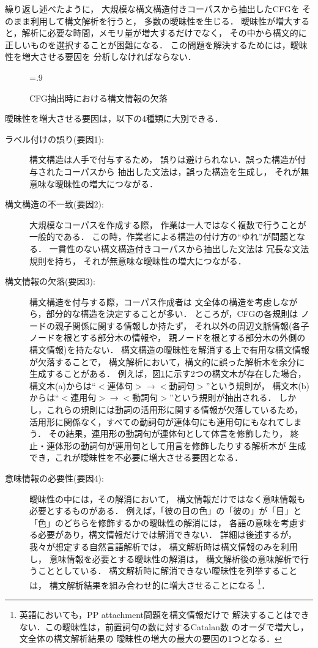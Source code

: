 繰り返し述べたように，
大規模な構文構造付きコーパスから抽出したCFGを
そのまま利用して構文解析を行うと，
多数の曖昧性を生じる．
曖昧性が増大すると，解析に必要な時間，メモリ量が増大するだけでなく，
その中から構文的に正しいものを選択することが困難になる．
この問題を解決するためには，曖昧性を増大させる要因を
分析しなければならない．

\begin{figure}[tp]
  \centering
  \epsfxsize=.9\textwidth
  \caption{CFG抽出時における構文情報の欠落}
  \label{fig:lack_of_syn}
\end{figure}

曖昧性を増大させる要因は，以下の4種類に大別できる．
\begin{description}
\item[ラベル付けの誤り(要因1): ] 構文構造は人手で付与するため，
  誤りは避けられない．誤った構造が付与されたコーパスから
  抽出した文法は，誤った構造を生成し，
  それが無意味な曖昧性の増大につながる．
\item[構文構造の不一致(要因2): ] 大規模なコーパスを作成する際，
  作業は一人ではなく複数で行うことが一般的である．
  この時，作業者による構造の付け方の``ゆれ''が問題となる．
  一貫性のない構文構造付きコーパスから抽出した文法は
  冗長な文法規則を持ち，
  それが無意味な曖昧性の増大につながる．
\item[構文情報の欠落(要因3): ] 構文構造を付与する際，コーパス作成者は
  文全体の構造を考慮しながら，部分的な構造を決定することが多い．
  ところが，CFGの各規則は
  ノードの親子関係に関する情報しか持たず，
  それ以外の周辺文脈情報(各子ノードを根とする部分木の情報や，
  親ノードを根とする部分木の外側の構文情報)を持たない．
  構文構造の曖昧性を解消する上で有用な構文情報が欠落することで，
  構文解析において，構文的に誤った解析木を余分に生成することがある．
  例えば，図\ref{fig:lack_of_syn}に示す2つの構文木が存在した場合，
  構文木(a)からは``$<$連体句$>\to <$動詞句$>$''という規則が，
  構文木(b)からは``$<$連用句$>\to <$動詞句$>$''という規則が抽出される．
  しかし，これらの規則には動詞の活用形に関する情報が欠落しているため，
  活用形に関係なく，すべての動詞句が連体句にも連用句にもなれてしまう．
  その結果，連用形の動詞句が連体句として体言を修飾したり，
  終止・連体形の動詞句が連用句として用言を修飾したりする解析木が
  生成でき，これが曖昧性を不必要に増大させる要因となる．
\item[意味情報の必要性(要因4): ] 曖昧性の中には，その解消において，
  構文情報だけではなく意味情報も必要とするものがある．
  例えば，「彼の目の色」の「彼の」が「目」と
  「色」のどちらを修飾するかの曖昧性の解消には，
  各語の意味を考慮する必要があり，構文情報だけでは解消できない．
  詳細は後述するが，我々が想定する自然言語解析では，
  構文解析時は構文情報のみを利用し，
  意味情報を必要とする曖昧性の解消は，
  構文解析後の意味解析で行うこととしている．
  構文解析時に解消できない曖昧性を列挙することは，
  構文解析結果を組み合わせ的に増大させることになる
  \footnote{英語においても，PP attachment問題を構文情報だけで
  解決することはできない．この曖昧性は，前置詞句の数に対するCatalan数
  のオーダで増大し\cite{martin:87,church:82}，文全体の構文解析結果の
  曖昧性の増大の最大の要因の1つとなる．}．
\end{description}



